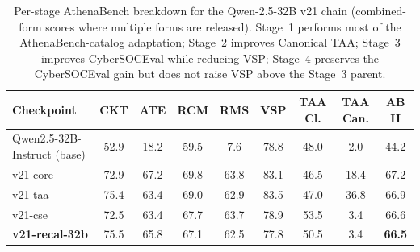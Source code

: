 \documentclass[conference]{IEEEtran}
\begin{document}
\begin{table}[t]
\centering
\caption{Per-stage AthenaBench breakdown for the Qwen-2.5-32B v21 chain (combined-form scores where multiple forms are released). Stage~1 performs most of the AthenaBench-catalog adaptation; Stage~2 improves Canonical TAA; Stage~3 improves CyberSOCEval while reducing VSP; Stage~4 preserves the CyberSOCEval gain but does not raise VSP above the Stage~3 parent.}
\label{tab:results-per-stage}
\small
\begin{tabular}{lcccccccc}
\hline
\textbf{Checkpoint} & \textbf{CKT} & \textbf{ATE} & \textbf{RCM} & \textbf{RMS} & \textbf{VSP} & \textbf{TAA Cl.} & \textbf{TAA Can.} & \textbf{AB II} \\
\hline
Qwen2.5-32B-Instruct (base) & 52.9 & 18.2 & 59.5 & 7.6  & 78.8 & 48.0 & 2.0  & 44.2 \\
v21-core                    & 72.9 & 67.2 & 69.8 & 63.8 & 83.1 & 46.5 & 18.4 & 67.2 \\
v21-taa                     & 75.4 & 63.4 & 69.0 & 62.9 & 83.5 & 47.0 & 36.8 & 66.9 \\
v21-cse                     & 72.5 & 63.4 & 67.7 & 63.7 & 78.9 & 53.5 & 3.4  & 66.6 \\
\textbf{v21-recal-32b}      & 75.5 & 65.8 & 67.1 & 62.5 & 77.8 & 50.5 & 3.4  & \textbf{66.5} \\
\hline
\end{tabular}
\end{table}
\end{document}
